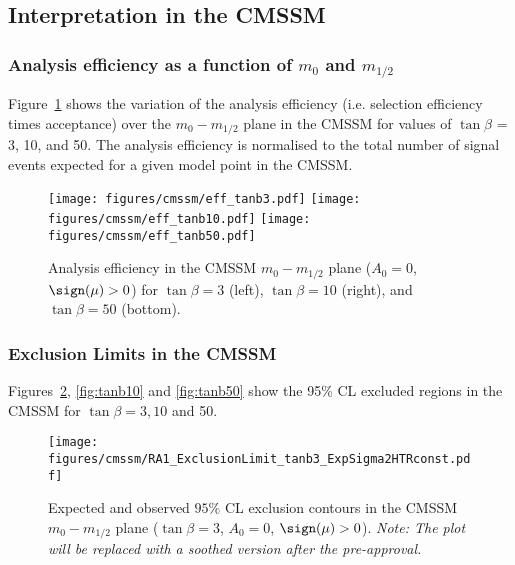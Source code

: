 \subsection{Interpretation in the CMSSM \label{sec:cmssm}}

\subsubsection{Analysis efficiency as a function of $m_0$ and $m_{1/2}$}

Figure~\ref{fig:seleff} shows the variation of the analysis efficiency
(i.e. selection efficiency times acceptance) over the $m_0 - m_{1/2}$
plane in the CMSSM for values of $\tan\beta$ = 3, 10, and 50. The
analysis efficiency is normalised to the total number of signal events
expected for a given model point in the CMSSM.

\begin{figure}[h]
   \begin{center}
    \texttt{[image: figures/cmssm/eff\_tanb3.pdf]} 
    \texttt{[image: figures/cmssm/eff\_tanb10.pdf]} 
     \texttt{[image: figures/cmssm/eff\_tanb50.pdf]} 
     \caption{\label{fig:seleff} Analysis efficiency in the CMSSM $m_0
       - m_{1/2}$ plane ($A_0 = 0$, $\sign(\mu)>0$) for $\tan\beta =
       3$ (left), $\tan\beta = 10$ (right), and $\tan\beta = 50$
       (bottom).}
\end{center}
\end{figure}



\subsubsection{Exclusion Limits in the CMSSM}

Figures~\ref{fig:tanb3}, \ref{fig:tanb10} and \ref{fig:tanb50} show
the 95\% CL excluded regions in the CMSSM for $\tan\beta = 3, 10$ and
50.


\begin{figure}[h]
   \begin{center}
    \texttt{[image: figures/cmssm/RA1\_ExclusionLimit\_tanb3\_ExpSigma2HTRconst.pdf]} 
 \caption{\label{fig:tanb3} Expected and observed $95\%$ CL exclusion contours in the 
CMSSM $m_0 - m_{1/2}$ plane ($\tan \beta = 3$, $A_0 = 0$, $\sign(\mu)>0$). {\it Note: The plot will be replaced with a soothed version after the pre-approval.}} 
\end{center}
\end{figure}


